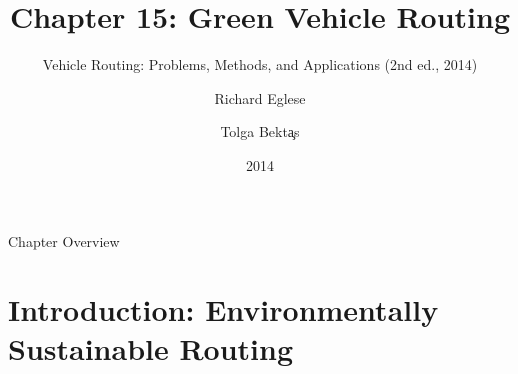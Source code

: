 \documentclass[aspectratio=169,10pt]{beamer}
\title[Ch.\,15: Green VRP]{%
  Chapter 15: Green Vehicle Routing}
\subtitle{Vehicle Routing: Problems, Methods, and Applications (2nd ed., 2014)}
\author{Richard Eglese \and Tolga Bekt\c{a}s}
\institute{Slides prepared for self-study — Lancaster University Management School}
\date{2014}
\begin{document}

\begin{frame}
  \titlepage
\end{frame}

\begin{frame}[allowframebreaks]{Chapter Overview}
  \tableofcontents
\end{frame}

\section{Introduction: Environmentally Sustainable Routing}
\end{document}
